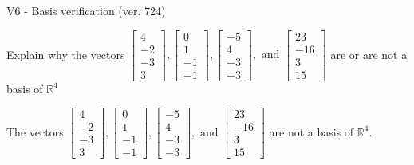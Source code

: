 \begin{exercise}
  \begin{exerciseTitle}V6 - Basis verification (ver. 724)\end{exerciseTitle}
  \begin{exerciseStatement}
    Explain why the vectors \(\left[\begin{array}{r}
4 \\
-2 \\
-3 \\
3
\end{array}\right] , \left[\begin{array}{r}
0 \\
1 \\
-1 \\
-1
\end{array}\right] , \left[\begin{array}{r}
-5 \\
4 \\
-3 \\
-3
\end{array}\right] , \text{ and } \left[\begin{array}{r}
23 \\
-16 \\
3 \\
15
\end{array}\right]\) are or are not a basis of \(\mathbb{R}^4\)	


  \end{exerciseStatement}
  \begin{exerciseAnswer}
   The vectors \(\left[\begin{array}{r}
4 \\
-2 \\
-3 \\
3
\end{array}\right] , \left[\begin{array}{r}
0 \\
1 \\
-1 \\
-1
\end{array}\right] , \left[\begin{array}{r}
-5 \\
4 \\
-3 \\
-3
\end{array}\right] , \text{ and } \left[\begin{array}{r}
23 \\
-16 \\
3 \\
15
\end{array}\right]\) 
  	 are not  a basis of \(\mathbb{R}^4\).
  


  \end{exerciseAnswer}
\end{exercise}